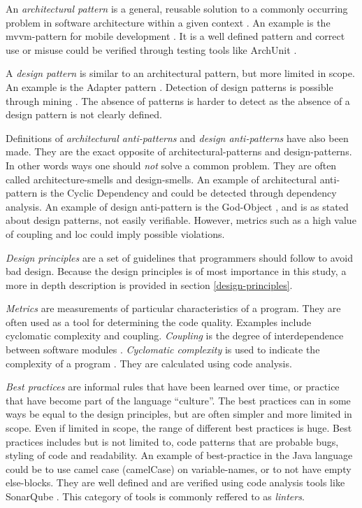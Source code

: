 \documentclass{report}
\begin{document}
An \textit{architectural pattern} is a general, reusable solution to a commonly occurring problem in software architecture within a given context \cite{architecturalpattern}. An example is the \gls{mvvm}-pattern for mobile development \cite{mvvm}. It is a well defined pattern and correct use or misuse could be verified through testing tools like ArchUnit \cite{archunit}. 

A \textit{design pattern} is similar to an architectural pattern, but more limited in scope. An example is the Adapter pattern \cite{Adapterp54:online}. Detection of design patterns is possible through mining \cite{TEKIN2014406}. The absence of patterns is harder to detect as the absence of a design pattern is not clearly defined.

Definitions of \textit{architectural anti-patterns} and \textit{design anti-patterns} have also been made. They are the exact opposite of architectural-patterns and design-patterns. In other words ways one should {\em not} solve a common problem. They are often called architecture-smells and design-smells. An example of architectural anti-pattern is the Cyclic Dependency \cite{cyclicdependency} and could be detected through dependency analysis. An example of design anti-pattern is the God-Object \cite{Godobjec14:online}, and is as stated about design patterns, not easily verifiable. However, metrics such as a high value of coupling and \gls{loc} could imply possible violations.


\textit{Design principles} are a set of guidelines that programmers should follow to avoid bad design. Because the design principles is of most importance in this study, a more in depth description is provided in section \ref{design-principles}.

\textit{Metrics} are measurements of particular characteristics of a program. They are often used as a tool for determining the code quality. Examples include cyclomatic complexity and coupling. \textit{Coupling} is the degree of interdependence between software modules \cite{Coupling2:online}. \textit{Cyclomatic complexity} is used to indicate the complexity of a program \cite{Cyclomat54:online}. They are calculated using code analysis.

\textit{Best practices} are informal rules that have been learned over time, or practice that have become part of the language ``culture''. The best practices can in some ways be equal to the design principles, but are often simpler and more limited in scope. Even if limited in scope, the range of different best practices is huge. Best practices includes but is not limited to, code patterns that are probable bugs, styling of code and readability. An example of best-practice in the Java language could be to use camel case (camelCase) \cite{camelcase} on variable-names, or to not have empty else-blocks. They are well defined and are verified using code analysis tools like SonarQube \cite{sonarqube}. This category of tools is commonly reffered to as \textit{linters}.
\end{document}
